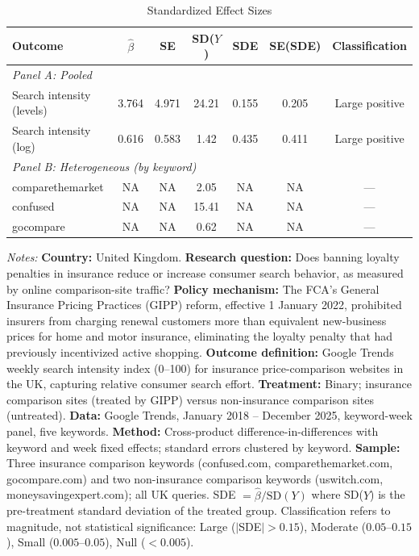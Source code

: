 \begin{table}[htbp]
\centering
\caption{Standardized Effect Sizes}
\label{tab:sde}
\begin{threeparttable}
\begin{tabular}{lcccccc}
\toprule
Outcome & $\hat{\beta}$ & SE & SD($Y$) & SDE & SE(SDE) & Classification \\
\midrule
\multicolumn{7}{l}{\textit{Panel A: Pooled}} \\
Search intensity (levels) & 3.764 & 4.971 & 24.21 & 0.155 & 0.205 & Large positive \\
Search intensity (log) & 0.616 & 0.583 & 1.42 & 0.435 & 0.411 & Large positive \\
\midrule
\multicolumn{7}{l}{\textit{Panel B: Heterogeneous (by keyword)}} \\
comparethemarket & NA & NA & 2.05 & NA & NA & --- \\
confused & NA & NA & 15.41 & NA & NA & --- \\
gocompare & NA & NA & 0.62 & NA & NA & --- \\
\bottomrule
\end{tabular}
\begin{tablenotes}[flushleft]
\small
\item \textit{Notes:} \textbf{Country:} United Kingdom. \textbf{Research question:} Does banning loyalty penalties in insurance reduce or increase consumer search behavior, as measured by online comparison-site traffic? \textbf{Policy mechanism:} The FCA's General Insurance Pricing Practices (GIPP) reform, effective 1 January 2022, prohibited insurers from charging renewal customers more than equivalent new-business prices for home and motor insurance, eliminating the loyalty penalty that had previously incentivized active shopping. \textbf{Outcome definition:} Google Trends weekly search intensity index (0--100) for insurance price-comparison websites in the UK, capturing relative consumer search effort. \textbf{Treatment:} Binary; insurance comparison sites (treated by GIPP) versus non-insurance comparison sites (untreated). \textbf{Data:} Google Trends, January 2018 -- December 2025, keyword-week panel, five keywords. \textbf{Method:} Cross-product difference-in-differences with keyword and week fixed effects; standard errors clustered by keyword. \textbf{Sample:} Three insurance comparison keywords (confused.com, comparethemarket.com, gocompare.com) and two non-insurance comparison keywords (uswitch.com, moneysavingexpert.com); all UK queries. SDE $= \hat{\beta} / \text{SD}(Y)$ where SD($Y$) is the pre-treatment standard deviation of the treated group. Classification refers to magnitude, not statistical significance: Large ($|$SDE$| > 0.15$), Moderate ($0.05$--$0.15$), Small ($0.005$--$0.05$), Null ($< 0.005$). 
\end{tablenotes}
\end{threeparttable}
\end{table}
